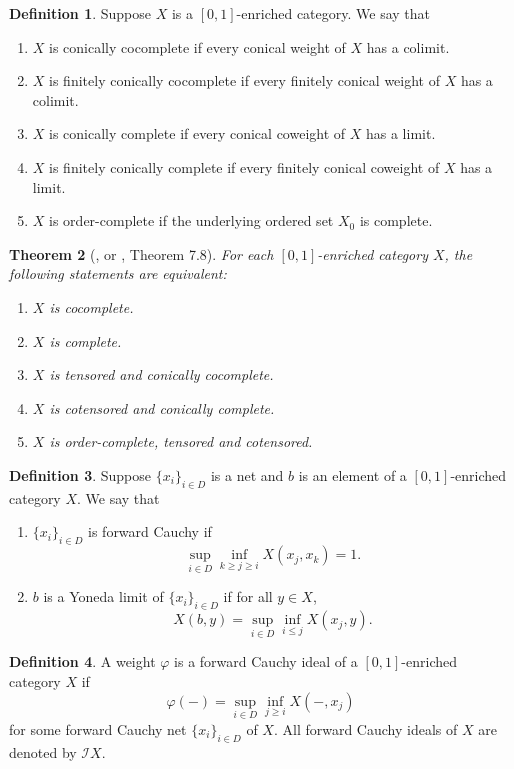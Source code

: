 \documentclass[preprint,3p,times]{elsarticle}
\theoremstyle{plain}
\newtheorem{thm}{Theorem}[section]
\theoremstyle{definition}
\newtheorem{definition}[thm]{Definition}
\renewcommand{\phi}{\varphi}
\numberwithin{equation}{section}
\begin{document}
\begin{definition}
	Suppose \( X \) is a \([0,1]\)-enriched category. We say that
	\begin{enumerate}[label={\rm(\arabic*)}] 
		\item \( X \) is conically cocomplete if every conical weight of \( X \) has a colimit.
		\item \( X \) is finitely  conically cocomplete if every  finitely conical weight of \( X \) has a colimit.
		\item \( X \) is conically complete if every conical coweight of \( X \) has a limit.
		\item \( X \) is finitely  conically complete if every  finitely conical coweight of \( X \) has a limit.
		\item \( X \) is order-complete if the underlying ordered set \( X_0 \) is complete.
	\end{enumerate}
\end{definition}
\begin{thm}[\cite{kelly1982basic,Stubbe}, or \cite{Zhang2024IntroductoryNO}, Theorem 7.8]\label{complete category} 
	For each \([0,1]\)-enriched category $X$, the
	following statements are equivalent:
	\begin{enumerate}[label={\rm(\arabic*)}]
		\item $X$ is cocomplete.
		\item $X$ is complete.
		\item $X$ is tensored and conically cocomplete.
		\item $X$ is cotensored and conically complete.
		\item $X$ is order-complete, tensored and cotensored.
	\end{enumerate}
\end{thm}
\begin{definition}
	Suppose $\{x_i\}_{i \in D}$ is a net and $b$ is an element of a \([0,1]\)-enriched
	category $X$. We say that
	\begin{enumerate} [label={\rm(\arabic*)}]
		\item  $\{x_i\}_{i \in D}$ is forward Cauchy if
		\[
		\sup_{i \in D} \inf_{k \geq j \geq i} X(x_j, x_k) = 1.
		\]
		\item  $b$ is a Yoneda limit of $\{x_i\}_{i \in D}$ if for all $y \in X$,
		\[
		X(b, y) = \sup_{i \in D} \inf_{i \leq j} X(x_j, y).
		\]
	\end{enumerate}
\end{definition} 
\begin{definition}
   A weight \(\phi\) is a forward Cauchy ideal of a \([0,1]\)-enriched category $X$ if \[\phi(-) = \sup_{i \in D} \inf_{j \geq i} X(-, x_j)\] for some forward Cauchy net $\{x_i\}_{i \in D}$ of $X$.  All forward Cauchy ideals of \(X\) are denoted by \(\mathcal{I}X\).
\end{definition}
\end{document}
